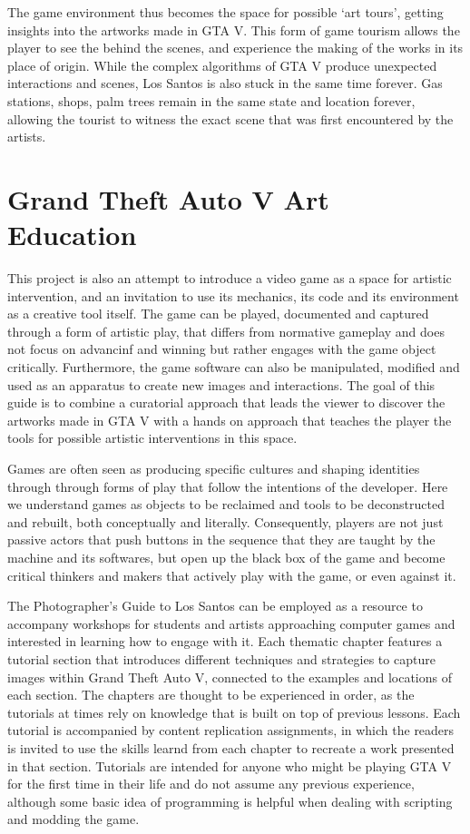 \documentclass[
  openany]{book}
\begin{document}
The game environment thus becomes the space for possible `art tours', getting insights into the artworks made in GTA V. This form of game tourism allows the player to see the behind the scenes, and experience the making of the works in its place of origin. While the complex algorithms of GTA V produce unexpected interactions and scenes, Los Santos is also stuck in the same time forever. Gas stations, shops, palm trees remain in the same state and location forever, allowing the tourist to witness the exact scene that was first encountered by the artists.

\hypertarget{grand-theft-auto-v-art-education}{%
\section*{Grand Theft Auto V Art Education}\label{grand-theft-auto-v-art-education}}

This project is also an attempt to introduce a video game as a space for artistic intervention, and an invitation to use its mechanics, its code and its environment as a creative tool itself. The game can be played, documented and captured through a form of artistic play, that differs from normative gameplay and does not focus on advancinf and winning but rather engages with the game object critically. Furthermore, the game software can also be manipulated, modified and used as an apparatus to create new images and interactions. The goal of this guide is to combine a curatorial approach that leads the viewer to discover the artworks made in GTA V with a hands on approach that teaches the player the tools for possible artistic interventions in this space.

Games are often seen as producing specific cultures and shaping identities through through forms of play that follow the intentions of the developer. Here we understand games as objects to be reclaimed and tools to be deconstructed and rebuilt, both conceptually and literally. Consequently, players are not just passive actors that push buttons in the sequence that they are taught by the machine and its softwares, but open up the black box of the game and become critical thinkers and makers that actively play with the game, or even against it.

The Photographer's Guide to Los Santos can be employed as a resource to accompany workshops for students and artists approaching computer games and interested in learning how to engage with it. Each thematic chapter features a tutorial section that introduces different techniques and strategies to capture images within Grand Theft Auto V, connected to the examples and locations of each section. The chapters are thought to be experienced in order, as the tutorials at times rely on knowledge that is built on top of previous lessons. Each tutorial is accompanied by content replication assignments, in which the readers is invited to use the skills learnd from each chapter to recreate a work presented in that section. Tutorials are intended for anyone who might be playing GTA V for the first time in their life and do not assume any previous experience, although some basic idea of programming is helpful when dealing with scripting and modding the game.
\end{document}
